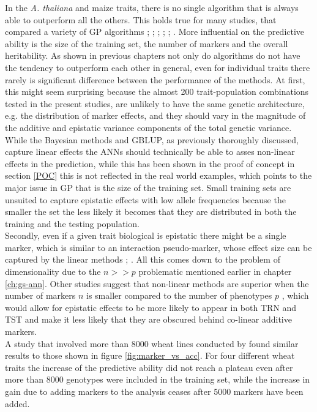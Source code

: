 In the \textit{A. thaliana} and maize traits, there is no single algorithm that is always
able to outperform all the others. This holds true for many studies, that compared a
variety of GP algorithms \cite{dlc2009}; \cite{heslot2012genomic};
\cite{blondel2015ranking}; \cite{Ramstein_2016}; \cite{roorkiwal2016genome};
\cite{azodi2019}. More influential on the predictive ability is the size of the training
set, the number of markers and the overall heritability. As shown in previous chapters not
only do algorithms do not have the tendency to outperform each other in general, even for
individual traits there rarely is significant difference between the performance of the
methods. At first, this might seem surprising because the almost 200 trait-population
combinations tested in the present studies, are unlikely to have the same genetic
architecture, e.g. the distribution of marker effects, and they should vary in the
magnitude of the additive and epistatic variance components of the total genetic
variance. While the Bayesian methods and GBLUP, as previously thoroughly discussed,
capture linear effects the ANNs should technically be able to asses non-linear effects in
the prediction, while this has been shown in the proof of concept in section \ref{POC}
this is not reflected in the real world examples, which points to the major issue in GP
that is the size of the training set. Small training sets are unsuited to capture
epistatic effects with low allele frequencies because the smaller the set the less likely
it becomes that they are distributed in both the training and the testing
population.\\
Secondly, even if a given trait biological is epistatic there might be a single marker,
which is similar to an interaction pseudo-marker, whose effect size can be captured by the
linear methods \cite{hill2008data}; \cite{monir2018dominance}. All this comes down to the
problem of dimensionality due to the $n >> p$ problematic mentioned earlier in chapter
\ref{ch:gs-ann}. Other studies suggest that non-linear methods are superior when the
number of markers $n$ is smaller compared to the number of phenotypes $p$
\cite{azodi2019}, which would allow for epistatic effects to be more likely to appear in
both TRN and TST and make it less likely that they are obscured behind co-linear
additive markers.\\
A study that involved more than 8000 wheat lines conducted by \cite{Norman_2018} found
similar results to those shown in figure \ref{fig:marker_vs_acc}. For four different wheat
traits the increase of the predictive ability did not reach a plateau even after more than
8000 genotypes were included in the training set, while the increase in gain due to adding
markers to the analysis ceases after 5000 markers have been added.

